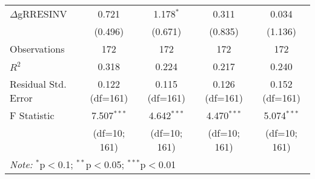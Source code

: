 \begin{table}[H]
\begin{tabular}{@{\extracolsep{5pt}}lcccc}
$\Delta$gRRESINV & 0.721 & 1.178$^{*}$ & 0.311 & 0.034 \\
                 & (0.496) & (0.671) & (0.835) & (1.136) \\

\hline
Observations & 172 & 172 & 172 & 172 \\
$R^2$ & 0.318 & 0.224 & 0.217 & 0.240 \\
Residual Std. Error & 0.122 (df=161) & 0.115 (df=161) & 0.126 (df=161) & 0.152 (df=161) \\
F Statistic & 7.507$^{***}$ & 4.642$^{***}$ & 4.470$^{***}$ & 5.074$^{***}$ \\
            & (df=10; 161) & (df=10; 161) & (df=10; 161) & (df=10; 161) \\
\hline
\hline
\multicolumn{5}{l}{\textit{Note:} $^{*}$p$<$0.1; $^{**}$p$<$0.05; $^{***}$p$<$0.01} \\
\end{tabular}
\end{table}

